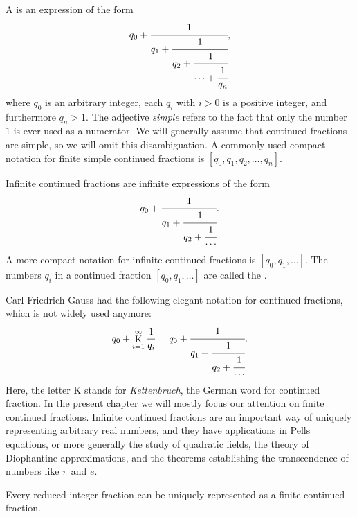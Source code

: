 \begin{definition}
  A  is an expression of the form
  \begin{equation*}
    q_0+\cfrac{1}{q_1+\cfrac{1}{q_2+\cfrac{1}{\cdots + \cfrac{1}{q_n}}}},
  \end{equation*}
  where $q_0$ is an arbitrary integer, each $q_i$ with $i>0$ is a positive integer, and furthermore $q_n>1$. The adjective \emph{simple} refers to the fact that only the number $1$ is ever used as a numerator. We will generally assume that continued fractions are simple, so we will omit this disambiguation. A commonly used compact notation for finite simple continued fractions is $[q_0,q_1,q_2,\ldots,q_n]$.

  Infinite continued fractions are infinite expressions of the form
  \begin{equation*}
    q_0+\cfrac{1}{q_1+\cfrac{1}{q_2+\cfrac{1}{\cdots}}}.
  \end{equation*}
  A more compact notation for infinite continued fractions is $[q_0,q_1,\ldots]$. The numbers $q_i$ in a continued fraction $[q_0,q_1,\ldots]$ are called the .
\end{definition}

Carl Friedrich Gauss had the following elegant notation for continued fractions, which is not widely used anymore:
\begin{equation*}
  q_0+\mathop{\mathrm{K}}\limits_{i=1}^{\infty} \frac{1}{q_i} =
  q_0+\cfrac{1}{q_1+\cfrac{1}{q_2+\cfrac{1}{\cdots}}}.
\end{equation*}
Here, the letter K stands for \emph{Kettenbruch}, the German word for continued fraction. In the present chapter we will mostly focus our attention on finite continued fractions. Infinite continued fractions are an important way of uniquely representing arbitrary real numbers, and they have applications in Pells equations, or more generally the study of quadratic fields, the theory of Diophantine approximations, and the theorems establishing the transcendence of numbers like $\pi$ and $e$.

\begin{theorem}
  Every reduced integer fraction can be uniquely represented as a finite continued fraction.
\end{theorem}

